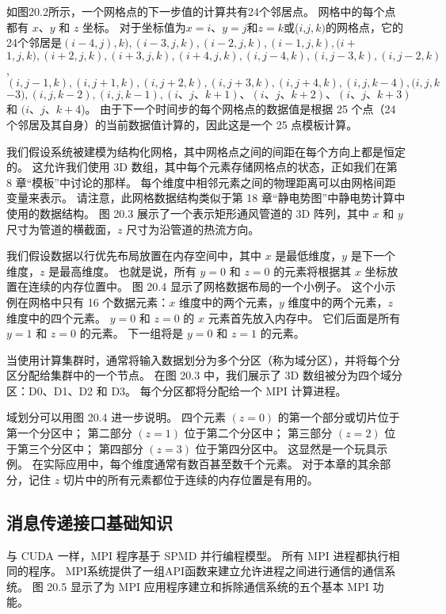 如图20.2所示，一个网格点的下一步值的计算共有24个邻居点。 网格中的每个点都有 $x、y$ 和 $z$ 坐标。 
对于坐标值为$x=i、y=j$和$z=k$或($i$,$j,k)$的网格点，它的24个邻居是$(i-4,j) , k),(i-3, j, k),(i-2, j, k),(i-1, j, k),(i+$ $1, j, k),(i+2, j , k),(i+3, j, k),(i+4, j, k),(i, j-4, k),(i, j-3, k),(i, j-2 , k)$, $(i, j-1, k),(i, j+1, k),(i, j+2, k),(i, j+3, k),(i, j +4, k),(i, j, k-4),(i, j, k$ $-3),(i, j, k-2),(i, j, k-1),(i 、j、k+1)、(i、j、k+2)、(i、j、k+3)$ 和 $(i、j、k+$4)。 
由于下一个时间步的每个网格点的数据值是根据 25 个点（24 个邻居及其自身）的当前数据值计算的，因此这是一个 25 点模板计算。

我们假设系统被建模为结构化网格，其中网格点之间的间距在每个方向上都是恒定的。 
这允许我们使用 3D 数组，其中每个元素存储网格点的状态，正如我们在第 8 章“模板”中讨论的那样。 
每个维度中相邻元素之间的物理距离可以由网格间距变量来表示。 
请注意，此网格数据结构类似于第 18 章“静电势图”中静电势计算中使用的数据结构。 
图 20.3 展示了一个表示矩形通风管道的 3D 阵列，其中 $x$ 和 $y$ 尺寸为管道的横截面，$z$ 尺寸为沿管道的热流方向。

我们假设数据以行优先布局放置在内存空间中，其中 $x$ 是最低维度，$y$ 是下一个维度，$z$ 是最高维度。 
也就是说，所有 $y=0$ 和 $z=0$ 的元素将根据其 $x$ 坐标放置在连续的内存位置中。 图 20.4 显示了网格数据布局的一个小例子。 
这个小示例在网格中只有 16 个数据元素：$x$ 维度中的两个元素，$y$ 维度中的两个元素，$z$ 维度中的四个元素。 
$y=0$ 和 $z=0$ 的 $x$ 元素首先放入内存中。 它们后面是所有 $y=1$ 和 $z=0$ 的元素。 下一组将是 $y=0$ 和 $z=1$ 的元素。

当使用计算集群时，通常将输入数据划分为多个分区（称为域分区），并将每个分区分配给集群中的一个节点。 
在图 20.3 中，我们展示了 3D 数组被分为四个域分区：D0、D1、D2 和 D3。 每个分区都将分配给一个 MPI 计算进程。

域划分可以用图 20.4 进一步说明。 四个元素 $(z=0)$ 的第一个部分或切片位于第一个分区中； 
第二部分 $(z=1)$ 位于第二个分区中； 第三部分 $(z=2)$ 位于第三个分区中； 第四部分 $(z=3)$ 位于第四分区中。 
这显然是一个玩具示例。 在实际应用中，每个维度通常有数百甚至数千个元素。 
对于本章的其余部分，记住 $z$ 切片中的所有元素都位于连续的内存位置是有用的。

\subsection{消息传递接口基础知识}
与 CUDA 一样，MPI 程序基于 SPMD 并行编程模型。 所有 MPI 进程都执行相同的程序。 
MPI系统提供了一组API函数来建立允许进程之间进行通信的通信系统。 
图 20.5 显示了为 MPI 应用程序建立和拆除通信系统的五个基本 MPI 功能。

